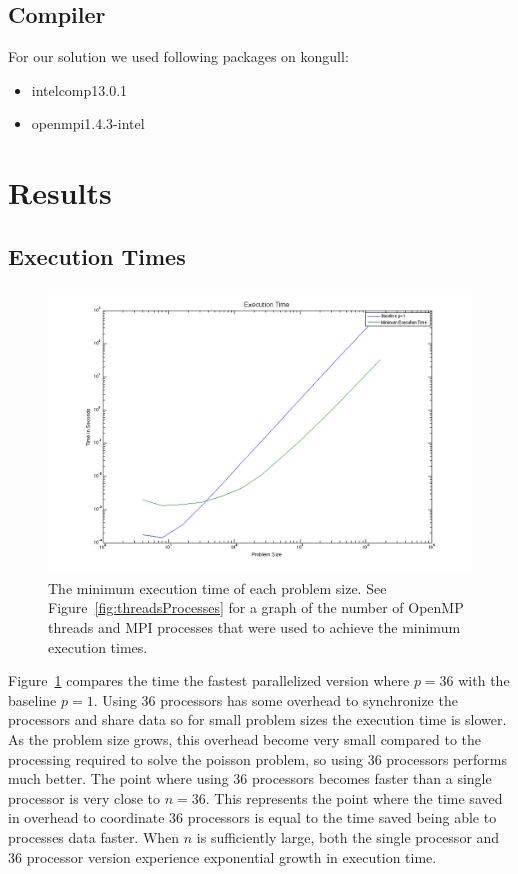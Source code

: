 \documentclass{article}
\begin{document}
\subsection{Compiler}

For our solution we used following packages on kongull:
\begin{itemize}
\item intelcomp13.0.1
\item openmpi1.4.3-intel
\end{itemize}
\section{Results}

\subsection{Execution Times}

	\begin{figure}[htbp]
	\begin{center}
	\includegraphics[width=15cm,keepaspectratio=true]{figs/executionTime}
	\caption{The minimum execution time of each problem size. See Figure~\ref{fig:threadsProcesses} for a graph of the number of OpenMP threads and MPI processes that were used to achieve the minimum execution times.}
	\label{fig:executionTime}
	\end{center}
	\end{figure}

	

	Figure~\ref{fig:executionTime} compares the time the fastest parallelized version where $p=36$ with the baseline $p=1$. Using 36 processors has some overhead to synchronize the processors and share data so for small problem sizes the execution time is slower. As the problem size grows, this overhead become very small compared to the processing required to solve the poisson problem, so using 36 processors performs much better. The point where using 36 processors becomes faster than a single processor is very close to $n=36$. This represents the point where the time saved in overhead to coordinate 36 processors is equal to the time saved being able to processes data faster. When $n$ is sufficiently large, both the single processor and 36 processor version experience exponential growth in execution time.  
\end{document}
